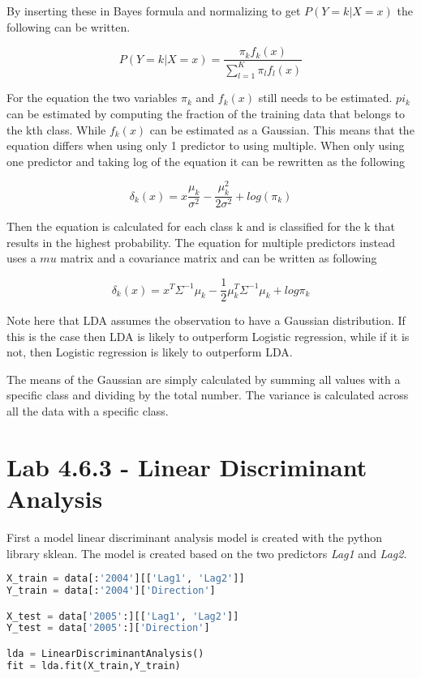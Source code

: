By inserting these in Bayes formula and normalizing to get $P(Y=k|X=x)$ the following can be written.

\begin{equation}
	P(Y=k|X = x) = \dfrac{\pi_k f_k(x)}{\sum_{l=1}^{K} \pi_l f_l(x)}
\end{equation}

For the equation the two variables $\pi_k$ and $f_k(x)$ still needs to be estimated. $pi_k$ can be estimated by computing the fraction of the training data that belongs to the kth class. While $f_k(x)$ can be estimated as a Gaussian. This means that the equation differs when using only 1 predictor to using multiple. When only using one predictor and taking log of the equation it can be rewritten as the following

\begin{equation}
	\delta_k(x) = x  \dfrac{\mu_k}{\sigma^2} - \dfrac{\mu_k^2}{2\sigma^2} + log(\pi_k)
\end{equation}

Then the equation is calculated for each class k and is classified for the k that results in the highest probability. The equation for multiple predictors instead uses a $mu$ matrix and a covariance matrix and can be written as following

\begin{equation}
	\delta_k(x) = x^T \Sigma^{-1} \mu_k -  \frac{1}{2} \mu_k^{T} \Sigma^{-1} \mu_k + log \pi_k
\end{equation}

Note here that LDA assumes the observation to have a Gaussian distribution. If this is the case then LDA is likely to outperform Logistic regression, while if it is not, then Logistic regression is likely to outperform LDA. 

The means of the Gaussian are simply calculated by summing all values with a specific class and dividing by the total number.
The variance is calculated across all the data with a specific class.

\section{Lab 4.6.3 - Linear Discriminant Analysis}
First a model linear discriminant analysis model is created with the python library sklean. The model is created based on the two predictors \emph{Lag1} and \emph{Lag2}. 


\begin{lstlisting}[language=Python, label=lst:ldaModel, caption=creating linear discriminant analysis model sklearn]
X_train = data[:'2004'][['Lag1', 'Lag2']]
Y_train = data[:'2004']['Direction']

X_test = data['2005':][['Lag1', 'Lag2']]
Y_test = data['2005':]['Direction']

lda = LinearDiscriminantAnalysis()
fit = lda.fit(X_train,Y_train)
\end{lstlisting}


